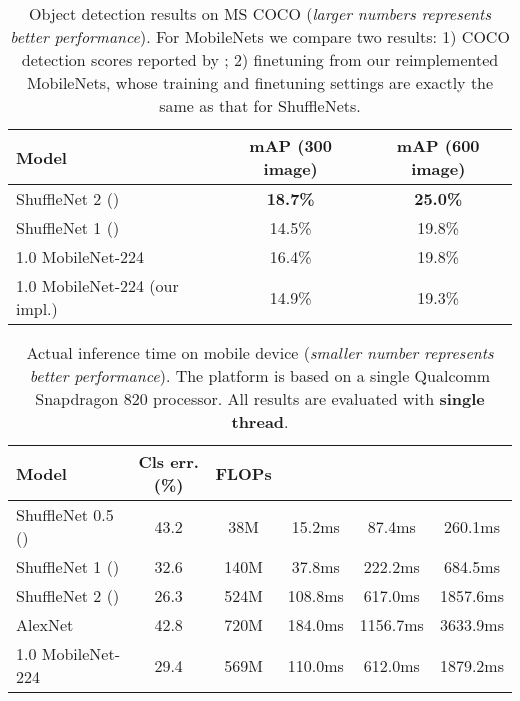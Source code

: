 \documentclass[10pt,twocolumn,letterpaper]{article}
\begin{document}
\begin{table*}[h]
	\begin{center}
		\begin{tabular}{l|c|c}
			\hline
			Model & mAP  (300 image) &mAP  (600 image) \\
			\hline\hline
			ShuffleNet 2 () & \textbf{18.7\%} & \textbf{25.0\%} \\
			ShuffleNet 1 () & 14.5\% & 19.8\% \\
			\hline
			1.0 MobileNet-224~\cite{howard2017mobilenets} & 16.4\% & 19.8\% \\
			1.0 MobileNet-224 (our impl.) & 14.9\% & 19.3\% \\
			\hline 
		\end{tabular}
	\end{center}
	\caption{ Object detection results on MS COCO (\emph{larger numbers represents better performance}). For MobileNets we compare two results: 1) COCO detection scores reported by \cite{howard2017mobilenets}; 2) finetuning from our reimplemented MobileNets, whose training and finetuning settings are exactly the same as that for ShuffleNets. }
	\label{tbl:det}
\end{table*}


\begin{table*}[!ht]
	\begin{center}
		\begin{tabular}{l|c|c|c|c|c}
			\hline
			Model & Cls err. (\%) & FLOPs &  &  &  \\
			\hline\hline
			ShuffleNet 0.5 () & 43.2 & 38M & 15.2ms & 87.4ms & 260.1ms \\
			ShuffleNet 1 () & 32.6 & 140M & 37.8ms & 222.2ms & 684.5ms \\
			ShuffleNet 2 () & 26.3 & 524M & 108.8ms & 617.0ms & 1857.6ms \\
			\hline
			AlexNet~\cite{krizhevsky2012imagenet} & 42.8 & 720M & 184.0ms & 1156.7ms & 3633.9ms \\
			1.0 MobileNet-224~\cite{howard2017mobilenets} & 29.4 & 569M & 110.0ms & 612.0ms & 1879.2ms \\
			\hline 
		\end{tabular}
	\end{center}
	\caption{ Actual inference time on mobile device (\emph{smaller number represents better performance}). The platform is based on a single Qualcomm Snapdragon 820 processor. All results are evaluated with \textbf{single thread}. }
	\label{tbl:actual}
\end{table*}
\end{document}

